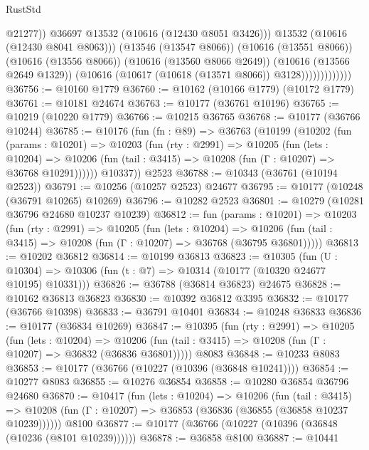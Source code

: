 \begin{lexlean}{RustStd}
\begin{coremodule}
                                  @21277))
                              @36697
                              @13532
                              (@10616 (@12430 @8051 @3426)))
                            @13532
                            (@10616 (@12430 @8041 @8063)))
                          (@13546 (@13547 @8066))
                          (@10616 (@13551 @8066))
                          (@10616 (@13556 @8066))
                          (@10616 (@13560 @8066 @2649))
                          (@10616 (@13566 @2649 @1329))
                          (@10616 (@10617 (@10618 (@13571 @8066)) @3128)))))))))))))
@36756 := @10160 @1779
@36760 := @10162 (@10166 @1779) (@10172 @1779)
@36761 := @10181 @24674
@36763 := @10177 (@36761 @10196)
@36765 := @10219 (@10220 @1779)
@36766 := @10215 @36765
@36768 := @10177 (@36766 @10244)
@36785 := @10176
    (fun (fn : @89) =>
    @36763
      (@10199
        (@10202
          (fun (params : @10201) =>
          @10203
            (fun (rty : @2991) =>
            @10205
              (fun (lets : @10204) =>
              @10206 (fun (tail : @3415) => @10208 (fun (Γ : @10207) => @36768 @10291))))))
        @10337))
    @2523
@36788 := @10343 (@36761 (@10194 @2523))
@36791 := @10256 (@10257 @2523) @24677
@36795 := @10177 (@10248 (@36791 @10265) @10269)
@36796 := @10282 @2523
@36801 := @10279 (@10281 @36796 @24680 @10237 @10239)
@36812 := fun (params : @10201) =>
  @10203
    (fun (rty : @2991) =>
    @10205
      (fun (lets : @10204) =>
      @10206 (fun (tail : @3415) => @10208 (fun (Γ : @10207) => @36768 (@36795 @36801)))))
@36813 := @10202 @36812
@36814 := @10199 @36813
@36823 := @10305
    (fun (U : @10304) => @10306 (fun (t : @7) => @10314 (@10177 (@10320 @24677 @10195) @10331)))
@36826 := @36788 (@36814 @36823) @24675
@36828 := @10162 @36813 @36823
@36830 := @10392 @36812 @3395
@36832 := @10177 (@36766 @10398)
@36833 := @36791 @10401
@36834 := @10248 @36833
@36836 := @10177 (@36834 @10269)
@36847 := @10395
    (fun (rty : @2991) =>
    @10205
      (fun (lets : @10204) =>
      @10206 (fun (tail : @3415) => @10208 (fun (Γ : @10207) => @36832 (@36836 @36801)))))
    @8083
@36848 := @10233 @8083
@36853 := @10177 (@36766 (@10227 (@10396 (@36848 @10241))))
@36854 := @10277 @8083
@36855 := @10276 @36854
@36858 := @10280 @36854 @36796 @24680
@36870 := @10417
    (fun (lets : @10204) =>
    @10206
      (fun (tail : @3415) =>
      @10208 (fun (Γ : @10207) => @36853 (@36836 (@36855 (@36858 @10237 @10239))))))
    @8100
@36877 := @10177 (@36766 (@10227 (@10396 (@36848 (@10236 (@8101 @10239))))))
@36878 := @36858 @8100
@36887 := @10441

\end{coremodule}
\end{lexlean}
